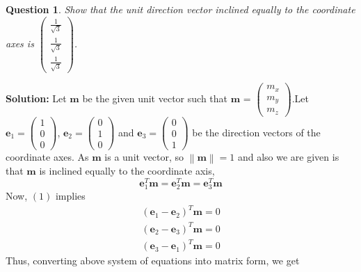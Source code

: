 \documentclass{article}
\newcommand{\solution}{\noindent \textbf{Solution: }}
\newtheorem{question}[theorem]{Question}
\newcommand{\myvec}[1]{\ensuremath{\begin{pmatrix}#1\end{pmatrix}}}
\newcommand{\norm}[1]{\left\lVert#1\right\rVert}
\let\vec\mathbf
\begin{document}
\begin{question}
	Show that the unit direction vector inclined equally to the coordinate axes is $\myvec{\frac{1}{\sqrt{3}} \\ \frac{1}{\sqrt{3}} \\ \frac{1}{\sqrt{3}}}$.
\end{question}
\solution Let $\vec{m}$ be the given unit vector such that $\vec{m}$ = $\myvec{m_x \\ m_y \\ m_z}$.Let $\vec{e}_1=\myvec{1 \\ 0 \\ 0}$, $\vec{e}_2=\myvec{0 \\ 1 \\ 0}$ and $\vec{e}_3=\myvec{0 \\ 0 \\ 1}$ be the direction vectors of the coordinate axes.
As $\vec{m}$ is a unit vector, so $\norm{\vec{m}} =1$ and also we are given is that $\vec{m}$ is inclined equally to the coordinate axis, 
\begin{equation}
\vec{e}_1^T\vec{m} =\vec{e}_2^T\vec{m}=\vec{e}_3^T\vec{m}
\end{equation}
Now, $(1)$ implies 
\begin{align*}
	(\vec{e}_1 -\vec{e}_2)^T\vec{m} = 0 \\
	(\vec{e}_2 -\vec{e}_3)^T\vec{m} = 0 \\
	(\vec{e}_3 -\vec{e}_1)^T\vec{m} = 0
\end{align*}
Thus, converting above system of equations into matrix form, we get
\end{document}
